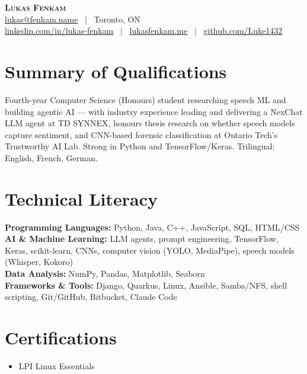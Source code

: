 \documentclass[letterpaper,11pt]{extarticle}
\begin{document}
\vspace*{4pt}
\begin{center}
  {\Huge \bfseries \scshape Lukas Fenkam} \\[3pt]
  \small
  \href{mailto:lukas@fenkam.name}{lukas@fenkam.name} \, $|$ \,
  Toronto, ON \\[2pt]
  \href{https://linkedin.com/in/lukas-fenkam}{linkedin.com/in/lukas-fenkam} \, $|$ \,
  \href{https://lukasfenkam.me}{lukasfenkam.me} \, $|$ \,
  \href{https://github.com/Luke1432}{github.com/Luke1432} \\[4pt]
\end{center}
\section{Summary of Qualifications}
Fourth-year Computer Science (Honours) student researching speech ML and building agentic AI --- with industry experience leading and delivering a NexChat LLM agent at TD SYNNEX, honours thesis research on whether speech models capture sentiment, and CNN-based forensic classification at Ontario Tech's Trustworthy AI Lab. Strong in Python and TensorFlow/Keras. Trilingual: English, French, German.

\section{Technical Literacy}
\small
\textbf{Programming Languages:} Python, Java, C++, JavaScript, SQL, HTML/CSS \\[2pt]
\textbf{AI \& Machine Learning:} LLM agents, prompt engineering, TensorFlow, Keras, scikit-learn, CNNs, computer vision (YOLO, MediaPipe), speech models (Whisper, Kokoro) \\[2pt]
\textbf{Data Analysis:} NumPy, Pandas, Matplotlib, Seaborn \\[2pt]
\textbf{Frameworks \& Tools:} Django, Quarkus, Linux, Ansible, Samba/NFS, shell scripting, Git/GitHub, Bitbucket, Claude Code
\normalsize
\section{Certifications}
\begin{itemize}[label=\checkmark,leftmargin=1.4em,itemsep=1pt,topsep=2pt,parsep=0pt]
  \item \small LPI Linux Essentials
\end{itemize}
\end{document}
